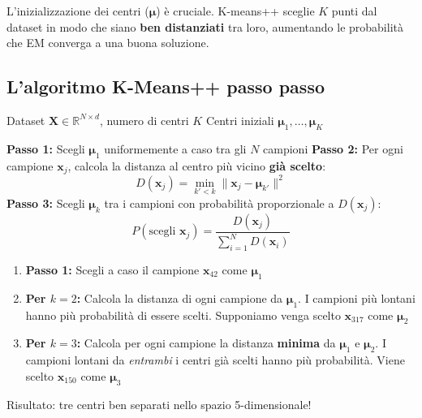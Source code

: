 \documentclass[11pt,a4paper]{article}
\begin{document}
L'inizializzazione dei centri ($\boldsymbol{\mu}$) \`e cruciale. K-means++ sceglie $K$ punti dal dataset in modo che siano \textbf{ben distanziati} tra loro, aumentando le probabilit\`a che EM converga a una buona soluzione.

\subsection{L'algoritmo K-Means++ passo passo}

\begin{algorithm}[H]
\caption{K-Means++ -- inizializzazione dei centri}
\begin{algorithmic}[1]
\Require Dataset $\mathbf{X} \in \mathbb{R}^{N \times d}$, numero di centri $K$
\Ensure Centri iniziali $\boldsymbol{\mu}_1, \ldots, \boldsymbol{\mu}_K$

\State \textbf{Passo 1:} Scegli $\boldsymbol{\mu}_1$ uniformemente a caso tra gli $N$ campioni
    \State \textbf{Passo 2:} Per ogni campione $\mathbf{x}_j$, calcola la distanza al centro pi\`u vicino \textbf{gi\`a scelto}:
    $$D(\mathbf{x}_j) = \min_{k' < k} \|\mathbf{x}_j - \boldsymbol{\mu}_{k'}\|^2$$
    \State \textbf{Passo 3:} Scegli $\boldsymbol{\mu}_k$ tra i campioni con probabilit\`a proporzionale a $D(\mathbf{x}_j)$:
    $$P(\text{scegli } \mathbf{x}_j) = \frac{D(\mathbf{x}_j)}{\sum_{i=1}^{N} D(\mathbf{x}_i)}$$
\EndFor
\end{algorithmic}
\end{algorithm}

\begin{exbox}[Esempio con $K=3$ e i nostri dati]
\begin{enumerate}
    \item \textbf{Passo 1:} Scegli a caso il campione $\mathbf{x}_{42}$ come $\boldsymbol{\mu}_1$
    \item \textbf{Per $k=2$:} Calcola la distanza di ogni campione da $\boldsymbol{\mu}_1$. I campioni pi\`u lontani hanno pi\`u probabilit\`a di essere scelti. Supponiamo venga scelto $\mathbf{x}_{317}$ come $\boldsymbol{\mu}_2$
    \item \textbf{Per $k=3$:} Calcola per ogni campione la distanza \textbf{minima} da $\boldsymbol{\mu}_1$ e $\boldsymbol{\mu}_2$. I campioni lontani da \emph{entrambi} i centri gi\`a scelti hanno pi\`u probabilit\`a. Viene scelto $\mathbf{x}_{150}$ come $\boldsymbol{\mu}_3$
\end{enumerate}
Risultato: tre centri ben separati nello spazio 5-dimensionale!
\end{exbox}
\end{document}
